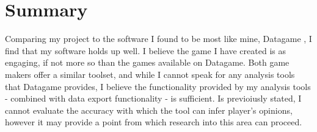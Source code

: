\section{Summary}
Comparing my project to the software I found to be most like mine, Datagame \cite{Datagame}, I find that my software holds up well. I believe the game I have created is as engaging, if not more so than the games available on Datagame. Both game makers offer a similar toolset, and while I cannot speak for any analysis tools that Datagame provides, I believe the functionality provided by my analysis tools - combined with data export functionality - is sufficient. Is previoiusly stated, I cannot evaluate the accuracy with which the tool can infer player's opinions, however it may provide a point from which research into this area can proceed.
